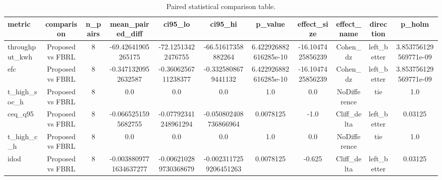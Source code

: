 \begin{table}[t]
\centering
\caption{Paired statistical comparison table.}
\label{tab:stats_auto}
\begin{tabular}{lcccccccccc}
\toprule
metric & comparison & n\_pairs & mean\_paired\_diff & ci95\_lo & ci95\_hi & p\_value & effect\_size & effect\_name & direction & p\_holm \\
\midrule
throughput\_kwh & Proposed vs FBRL & 8 & -69.42641905265175 & -72.12513422476755 & -66.51617358882264 & 6.422926882616285e-10 & -16.1047425856239 & Cohen\_dz & left\_better & 3.853756129569771e-09 \\
efc & Proposed vs FBRL & 8 & -0.3471320952632587 & -0.3606256711238377 & -0.3325808679441132 & 6.422926882616285e-10 & -16.1047425856239 & Cohen\_dz & left\_better & 3.853756129569771e-09 \\
t\_high\_soc\_h & Proposed vs FBRL & 8 & 0.0 & 0.0 & 0.0 & 1.0 & 0.0 & NoDifference & tie & 1.0 \\
ceq\_q95 & Proposed vs FBRL & 8 & -0.0665251595682755 & -0.07792341248961294 & -0.050802408736866964 & 0.0078125 & -1.0 & Cliff\_delta & left\_better & 0.03125 \\
t\_high\_c\_h & Proposed vs FBRL & 8 & 0.0 & 0.0 & 0.0 & 1.0 & 0.0 & NoDifference & tie & 1.0 \\
idod & Proposed vs FBRL & 8 & -0.0038809771634637277 & -0.006210289730368679 & -0.0023117259206451263 & 0.0078125 & -0.625 & Cliff\_delta & left\_better & 0.03125 \\
\bottomrule
\end{tabular}
\end{table}